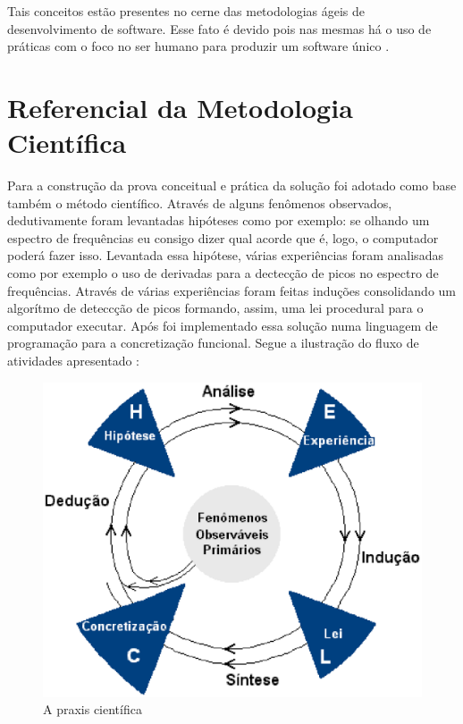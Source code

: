Tais conceitos estão presentes no cerne das metodologias ágeis de desenvolvimento de software. Esse fato é devido pois nas mesmas há o uso de práticas com o foco no ser humano para produzir um software único \cite{agile}.

\section{Referencial da Metodologia Científica}
\label{sec:referencialmetodocientifico}

Para a construção da prova conceitual e prática da solução foi adotado como base também o método científico. Através de alguns fenômenos observados, dedutivamente foram levantadas hipóteses como por exemplo: se olhando um espectro de frequências eu consigo dizer qual acorde que é, logo, o computador poderá fazer isso. Levantada essa hipótese, várias experiências foram analisadas como por exemplo o uso de derivadas para a dectecção de picos no espectro de frequências. Através de várias experiências foram feitas induções consolidando um algorítmo de deteccção de picos formando, assim, uma lei procedural para o computador executar. Após foi implementado essa solução numa linguagem de programação para a concretização funcional. Segue a ilustração do fluxo de atividades apresentado \cite{metodo}:

\begin{figure}[h]
	\centering
		\includegraphics[keepaspectratio=true,scale=0.7]{figuras/metodologia.eps}
	\caption{A praxis científica}
\end{figure}



